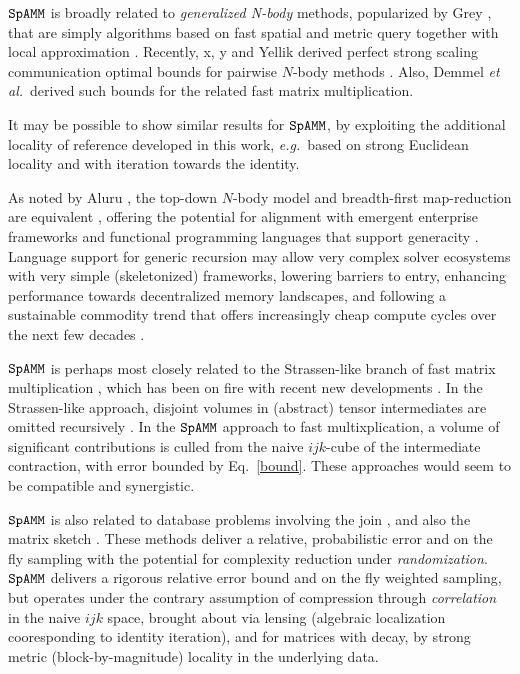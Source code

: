 \documentclass[letterpaper,twocolumn,amsmath,amsfont,amssymb,english,aps,jcp,preprintnumbers,groupaddress,nofootinbib,tightenlines]{revtex4}
\begin{document}
$\tt SpAMM$ is broadly related to {\em generalized N-body} methods,
popularized by Grey \cite{Gray2001,Gray2003}, that are simply algorithms based on fast
spatial and metric query \cite{Sammet} together with local approximation
\cite{}.  Recently, x, y and Yellik derived perfect strong scaling
communication optimal bounds for pairwise $N$-body methods
\cite{10.1109/IPDPSW.2012.303}.  Also, Demmel \emph{et al.}~derived such
bounds for the related fast matrix multiplication.  
\cite{Solomonik2011}

It may be possible
to show similar results for $\tt SpAMM$, by exploiting the additional
locality of reference developed in this work, {\em e.g.}~based on
strong Euclidean locality and with iteration towards the identity.

As noted by Aluru \cite{}, the top-down $N$-body model and
breadth-first map-reduction are equivalent \cite{}, offering the
potential for alignment with emergent enterprise frameworks \cite{}
and functional programming languages that support generacity
\cite{}. Language support for generic recursion may allow very complex
solver ecosystems with very simple (skeletonized) frameworks, lowering
barriers to entry, enhancing performance towards decentralized memory
landscapes, and following a sustainable commodity trend
\cite{softwaresustainanbilty} that offers increasingly cheap compute
cycles over the next few decades \cite{}.

$\tt SpAMM$ is perhaps most closely related to the Strassen-like
branch of fast matrix multiplication \cite{}, which has been on fire
with recent new developments \cite{}.  In the Strassen-like approach,
disjoint volumes in (abstract) tensor intermediates are omitted
recursively \cite{}.  In the $\tt SpAMM$ approach to fast
multixplication, a volume of significant contributions is culled from
the naive $ijk$-cube of the intermediate contraction, with error
bounded by Eq.~\ref{bound}.  These approaches would seem to be
compatible and synergistic.

$\tt SpAMM$ is also related to database problems involving the 
join \cite{Mishra92,Hoel94,Jacox03,Chen07,Amossen09,Lieberman08,Kim09}, and also 
the matrix sketch  \cite{Sarlos2006,Drineas2006,Mahoney2012,Pagh2013,Sivertsen2014,Woodruff2015}.
 These methods deliver a relative, probabilistic error 
and on the fly sampling with the potential for complexity reduction under {\em randomization}.
$\tt SpAMM$ delivers a rigorous relative error bound and on the fly weighted sampling, 
but operates under the contrary assumption of compression through {\em correlation}
in the naive $ijk$ space, brought about via lensing (algebraic localization cooresponding to identity iteration),
and for matrices with decay, by strong metric (block-by-magnitude) locality in the underlying data. 
\end{document}
